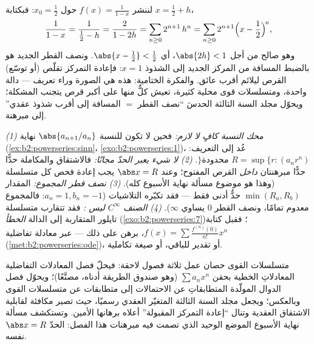 \begin{example}\label{ex:b2:powerseries:recenter}
لننشر $f(x) = \frac{1}{1-x}$ حول $x_0 = \frac12$: فبكتابة
$x = \frac12 + h$،
\[
\frac{1}{1 - x} = \frac{1}{\frac12 - h}
= \frac{2}{1 - 2h}
= \sum_{n\geq0} 2^{n+1}\,h^n
= \sum_{n\geq0} 2^{n+1}\Bigl(x - \frac12\Bigr)^{\!n},
\]
وهو صالح من أجل $\abs{2h} < 1$، أي $\abs{x - \frac12} < \frac12$.
ونصف القطر الجديد هو بالضبط المسافة من المركز الجديد إلى
الشذوذ $x = 1$: فإعادة التمركز تقلّص (أو توسّع)
القرص ليلائم أقرب عائق. والفكرة الختامية: هذه هي
الصورة وراء تعريف  --- دالة
واحدة، ومتسلسلات قوى محلية كثيرة، تعيش كلٌّ منها على أكبر
قرص يتجنب المشكلة؛ ويحوّل مجلد السنة الثالثة
الحدسَ ``نصف القطر $=$ المسافة إلى أقرب شذوذ
عقدي'' إلى مبرهنة.
\end{example}

\begin{remark}
\emph{(1) محك النسبة كافٍ لا لازم:} فحين لا تكون
للنسبة $\abs{a_{n+1}/a_n}$ نهاية
(\cref{ex:b2:powerseries:sinn}، \cref{exo:b2:powerseries:1})،
عُد إلى التعريف: $R = \sup\{r : (a_nr^n)$
محدودة$\}$. \emph{(2) لا شيء يعبر الحدّ مجانًا:}
فالاشتقاق والمكاملة حدًّا حدًّا مبرهنتان
\emph{داخل} القرص المفتوح؛ وعند $\abs x = R$ يجب إعادة فحص
كل متسلسلة (وهذا هو موضوع مسألة نهاية الأسبوع
كله). \emph{(3) نصف قطر المجموع:} المقدار $\min(R_a, R_b)$
حدٌّ أدنى فقط --- فقد تكبّره التلاشيات ($a_n = 1,
b_n = -1$: فالمجموع معدوم تمامًا، ونصف القطر $0$ يساوي $\infty$). \emph{(4)
الصنف $C^\infty$ ليس :} فقد تتقارب متسلسلة تايلور المتقاربة
إلى الدالة \emph{الخطأ}
(\cref{exo:b2:powerseries:7})؛ فقبل كتابة $f(x) = \sum
\frac{f^{(n)}(0)}{n!}x^n$، برهن على ذلك --- عبر معادلة تفاضلية
(\cref{met:b2:powerseries:ode})، أو تقدير للباقي، أو
صيغة تكاملية.
\end{remark}

\begin{remark}
متسلسلات القوى حصان عمل ثلاثة فصول لاحقة: فيحلّ
فصل المعادلات التفاضلية المعادلاتِ الخطية بحقن
$\sum a_nx^n$ (وهو صندوق الطريقة أدناه، مصنَّعًا)؛ ويحوّل
فصل الدوال المولّدة المتطابقاتِ عن الاحتمالات إلى متطابقات
عن متسلسلات القوى وبالعكس؛ ويجعل مجلد السنة الثالثة
المتغيّر العقدي رسميًا، حيث تصير  مكافئة لقابلية
الاشتقاق العقدية وتنال ``إعادة التمركز المقبولة'' أعلاه
برهانها الأمين. وتستكشف مسألة نهاية الأسبوع الموضع الوحيد
الذي تصمت فيه مبرهنات هذا الفصل: الحدّ $\abs x = R$ نفسه.
\end{remark}

